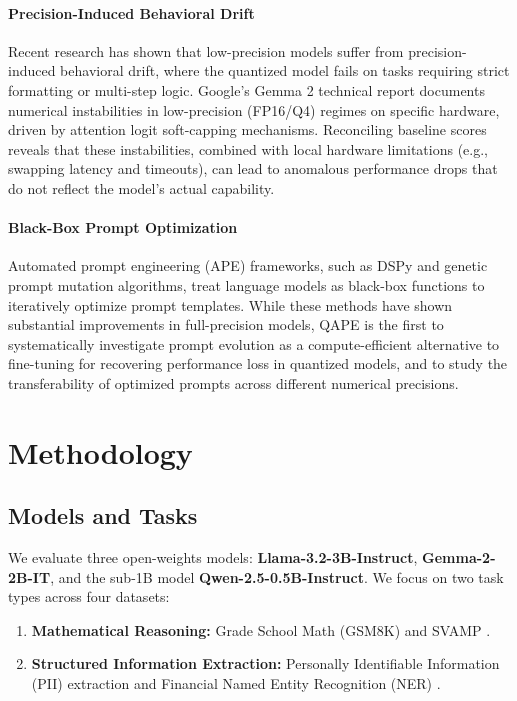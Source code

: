 \documentclass[11pt]{article}
\begin{document}
\paragraph{Precision-Induced Behavioral Drift}
Recent research has shown that low-precision models suffer from precision-induced behavioral drift, where the quantized model fails on tasks requiring strict formatting or multi-step logic. Google's Gemma 2 technical report \cite{gemma2} documents numerical instabilities in low-precision (FP16/Q4) regimes on specific hardware, driven by attention logit soft-capping mechanisms. Reconciling baseline scores reveals that these instabilities, combined with local hardware limitations (e.g., swapping latency and timeouts), can lead to anomalous performance drops that do not reflect the model's actual capability.

\paragraph{Black-Box Prompt Optimization}
Automated prompt engineering (APE) frameworks, such as DSPy \cite{khattab2023dspy} and genetic prompt mutation algorithms, treat language models as black-box functions to iteratively optimize prompt templates. While these methods have shown substantial improvements in full-precision models, QAPE is the first to systematically investigate prompt evolution as a compute-efficient alternative to fine-tuning for recovering performance loss in quantized models, and to study the transferability of optimized prompts across different numerical precisions.

\section{Methodology}
\subsection{Models and Tasks}
We evaluate three open-weights models: \textbf{Llama-3.2-3B-Instruct}, \textbf{Gemma-2-2B-IT}, and the sub-1B model \textbf{Qwen-2.5-0.5B-Instruct}. We focus on two task types across four datasets:
\begin{enumerate}
    \item \textbf{Mathematical Reasoning:} Grade School Math (GSM8K) \cite{gsm8k} and SVAMP \cite{svamp}.
    \item \textbf{Structured Information Extraction:} Personally Identifiable Information (PII) extraction \cite{cleanlab2021} and Financial Named Entity Recognition (NER) \cite{wu2023flare}.
\end{enumerate}
\end{document}
